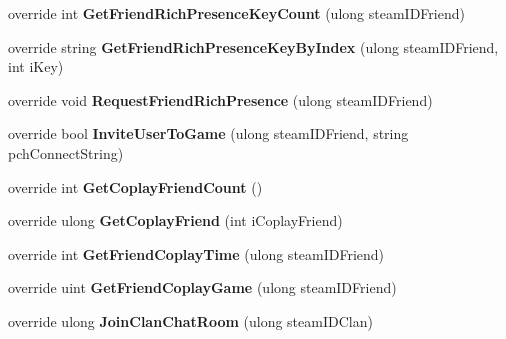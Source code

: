 \begin{DoxyCompactItemize}
override int {\bfseries Get\+Friend\+Rich\+Presence\+Key\+Count} (ulong steam\+I\+D\+Friend)
\item 
\mbox{\label{class_valve_1_1_steamworks_1_1_c_steam_friends_adcecfa4dbe3018de83af5d77c2ead4f0}} 
override string {\bfseries Get\+Friend\+Rich\+Presence\+Key\+By\+Index} (ulong steam\+I\+D\+Friend, int i\+Key)
\item 
\mbox{\label{class_valve_1_1_steamworks_1_1_c_steam_friends_a6fa7dca547ead181cf1613cd2a71015c}} 
override void {\bfseries Request\+Friend\+Rich\+Presence} (ulong steam\+I\+D\+Friend)
\item 
\mbox{\label{class_valve_1_1_steamworks_1_1_c_steam_friends_a0fe5f027df9b6bf49ab38721dadee391}} 
override bool {\bfseries Invite\+User\+To\+Game} (ulong steam\+I\+D\+Friend, string pch\+Connect\+String)
\item 
\mbox{\label{class_valve_1_1_steamworks_1_1_c_steam_friends_a73bfacf16dbbe8d5e759e05c6976e699}} 
override int {\bfseries Get\+Coplay\+Friend\+Count} ()
\item 
\mbox{\label{class_valve_1_1_steamworks_1_1_c_steam_friends_a1cfad35eeb47915c3486cb34ec2c4418}} 
override ulong {\bfseries Get\+Coplay\+Friend} (int i\+Coplay\+Friend)
\item 
\mbox{\label{class_valve_1_1_steamworks_1_1_c_steam_friends_a981add6fadcabc49cf308ec506a0446c}} 
override int {\bfseries Get\+Friend\+Coplay\+Time} (ulong steam\+I\+D\+Friend)
\item 
\mbox{\label{class_valve_1_1_steamworks_1_1_c_steam_friends_a3c5454f5d2a68d5cab4fe8e9fc71e473}} 
override uint {\bfseries Get\+Friend\+Coplay\+Game} (ulong steam\+I\+D\+Friend)
\item 
\mbox{\label{class_valve_1_1_steamworks_1_1_c_steam_friends_a2d091af1c1ccd5eade605684ac774149}} 
override ulong {\bfseries Join\+Clan\+Chat\+Room} (ulong steam\+I\+D\+Clan)

\end{DoxyCompactItemize}
